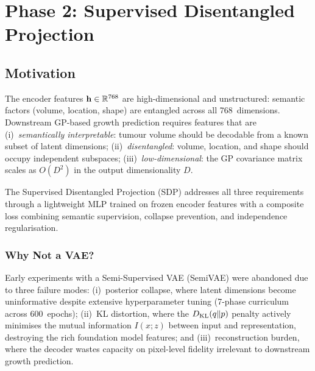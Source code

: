 \section{Phase 2: Supervised Disentangled Projection}
\label{sec:sdp}

\subsection{Motivation}
\label{sec:sdp:motivation}

The encoder features $\mathbf{h} \in \mathbb{R}^{768}$ are high-dimensional and
unstructured: semantic factors (volume, location, shape) are entangled across
all 768~dimensions. Downstream GP-based growth prediction requires features
that are (i)~\emph{semantically interpretable}: tumour volume should be
decodable from a known subset of latent dimensions; (ii)~\emph{disentangled}:
volume, location, and shape should occupy independent subspaces;
(iii)~\emph{low-dimensional}: the GP covariance matrix scales as $O(D^2)$ in
the output dimensionality $D$.

The Supervised Disentangled Projection (SDP) addresses all three requirements
through a lightweight MLP trained on frozen encoder features with a composite
loss combining semantic supervision, collapse prevention, and independence
regularisation.

\subsubsection{Why Not a VAE?}

Early experiments with a Semi-Supervised VAE (SemiVAE) were abandoned due to
three failure modes: (i)~posterior collapse, where latent dimensions become
uninformative despite extensive hyperparameter tuning (7-phase curriculum
across 600~epochs); (ii)~KL distortion, where the $D_{\operatorname{KL}}(q \| p)$ penalty
actively minimises the mutual information $I(x; z)$ between input and
representation, destroying the rich foundation model features; and
(iii)~reconstruction burden, where the decoder wastes capacity on
pixel-level fidelity irrelevant to downstream growth prediction.

